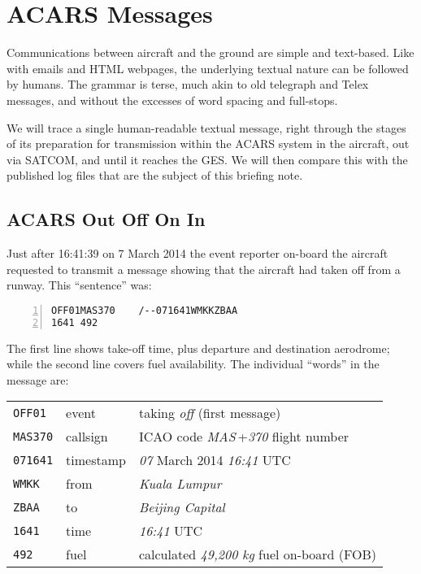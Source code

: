 \documentclass[tikz,a4paper,12pt]{article}
\begin{document}
\section{ACARS Messages}

Communications between aircraft and the ground are simple and
text-based.  Like with emails and HTML webpages, the underlying textual
nature can be followed by humans.  The grammar is terse, much akin to
old telegraph and Telex messages, and without the excesses of word
spacing and full-stops.

We will trace a single human-readable textual message, right through
the stages of its preparation for transmission within the \gls{ACARS} system
in the aircraft, out via SATCOM, and until it reaches the \gls{GES}.  We
will then compare this with the published log files that are the
subject of this briefing note.

\subsection{ACARS Out Off On In}

Just after 16:41:39 on 7 March 2014 the event reporter on-board the aircraft requested
to transmit a message showing that the aircraft had taken off from a runway.  This ``sentence'' was:

\begin{lstlisting}[language=ACARS,linewidth=\textwidth,numbers=left]
OFF01MAS370    /--071641WMKKZBAA
1641 492
\end{lstlisting}

The first line shows take-off time, plus departure and destination aerodrome;
while the second line covers fuel availability.  The individual ``words'' in the message are:

\begin{center}
\begin{tabular}{p{1.5cm}p{2cm}p{8cm}}
\hfill\texttt{OFF01}&event&taking \emph{off} (first message)\\
\hfill\texttt{MAS370}&callsign&\acrshort{ICAO} code \emph{MAS}\,+\emph{370} flight number\\
\hfill\texttt{071641}&timestamp& \emph{07} March 2014 \emph{16:41} UTC\\
\hfill\texttt{WMKK}&from&\emph{Kuala Lumpur}\\
\hfill\texttt{ZBAA}&to&\emph{Beijing Capital}\\
\hline
\hfill\texttt{1641}&time&\emph{16:41} UTC\\
\hfill\texttt{492}&fuel&calculated \emph{49,200 kg} fuel on-board (FOB)\\
\end{tabular}
\end{center}
\end{document}
